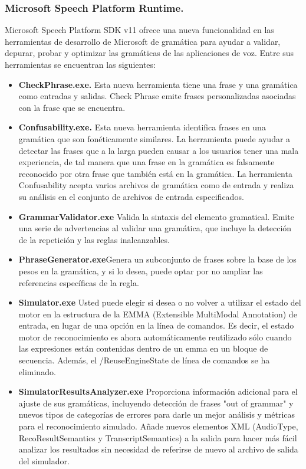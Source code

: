 \documentclass[11pt,a4paper]{article}
\begin{document}
\subsubsection{Microsoft Speech Platform Runtime.}
Microsoft Speech Platform SDK v11 ofrece una nueva funcionalidad en las herramientas de desarrollo de Microsoft de gramática para ayudar a validar, depurar, probar y optimizar las gramáticas de las aplicaciones de voz. Entre sus herramientas se encuentran las siguientes:
\begin{itemize}
\item \textbf{CheckPhrase.exe.} Esta nueva herramienta tiene una frase y una gramática como entradas y salidas. Check Phrase emite frases personalizadas asociadas con la frase que se encuentra.
\item \textbf{Confusability.exe.} Esta nueva herramienta identifica frases en una gramática que son fonéticamente similares. La herramienta puede ayudar a detectar las frases que a la larga pueden causar a los usuarios tener una mala experiencia, de tal manera que una frase en la gramática es falsamente reconocido por otra frase que también está en la gramática. La herramienta Confusability acepta varios archivos de gramática como de entrada y realiza su análisis en el conjunto de archivos de entrada especificados.
\item \textbf{GrammarValidator.exe} Valida la sintaxis del elemento gramatical. Emite una serie de advertencias al validar una gramática, que incluye la detección de la repetición y las reglas inalcanzables.
\item \textbf{PhraseGenerator.exe}Genera un subconjunto de frases sobre la base de los pesos en la gramática, y si lo desea, puede optar por no ampliar las referencias específicas de la regla.
\item \textbf{Simulator.exe} Usted puede elegir si desea o no volver a utilizar el estado del motor en la estructura de la EMMA (Extensible MultiModal Annotation) de entrada, en lugar de una opción en la línea de comandos. Es decir, el estado motor de reconocimiento es ahora automáticamente reutilizado sólo cuando las expresiones están contenidas dentro de un emma en un bloque de secuencia. Además, el /ReuseEngineState de línea de comandos se ha eliminado.
\item \textbf{SimulatorResultsAnalyzer.exe} Proporciona información adicional para el ajuste de sus gramáticas, incluyendo detección de frases "out of grammar" y nuevos tipos de categorías de errores para darle un mejor análisis y métricas para el reconocimiento simulado. Añade nuevos elementos XML (AudioType, RecoResultSemantics y TranscriptSemantics) a la salida para hacer más fácil analizar los resultados sin necesidad de referirse de nuevo al archivo de salida del simulador.
\end{itemize} 
\end{document}
